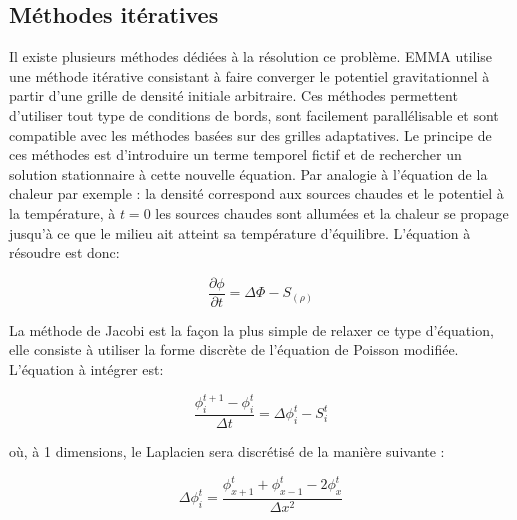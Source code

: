 \subsection{Méthodes itératives}


Il existe plusieurs méthodes dédiées à la résolution ce problème.
EMMA utilise une méthode itérative consistant à faire converger le potentiel gravitationnel à partir d'une grille de densité initiale arbitraire. 
Ces méthodes permettent d'utiliser tout type de conditions de bords, sont facilement parallélisable et sont compatible avec les méthodes basées sur des grilles adaptatives.
Le principe de ces méthodes est d'introduire un terme temporel fictif et de rechercher un solution stationnaire à cette nouvelle équation.
Par analogie à l'équation de la chaleur par exemple : la densité correspond aux sources chaudes et le potentiel à la température, à $t=0$ les sources chaudes sont allumées et la chaleur se propage jusqu'à ce que le milieu ait atteint sa température d'équilibre. 
L'équation à résoudre est donc:

\begin{equation}
\dfrac{\partial \phi}{\partial t} = \Delta \Phi -S_{(\rho)}
\end{equation}

La méthode de Jacobi est la façon la plus simple de relaxer ce type d'équation, elle consiste à utiliser la forme discrète de l'équation de Poisson modifiée. 
L'équation à intégrer est:

\begin{equation}
\dfrac{\phi^{t+1}_i - \phi^{t}_i}{\Delta t}  =  \Delta \phi_i^t - S_i^t
\end{equation}

où, à 1 dimensions, le Laplacien sera discrétisé de la manière suivante :

\begin{equation}
\Delta \phi_i^t = \dfrac{\phi_{x+1}^t  + \phi_{x-1}^t- 2\phi_{x}^t}{\Delta x ^2}
\end{equation}
		


